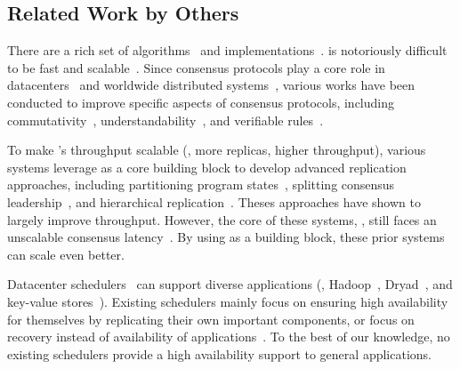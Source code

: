 \vspace{-.15in}\subsection{Related Work by Others} 
\label{sec:others-work}\vspace{-.075in}

There are a rich set of \paxos 
algorithms~\cite{paxos:practical,paxos,paxos:simple,paxos:complex,
epaxos:sosp13} 
and implementations~\cite{paxos:live,paxos:practical,chubby:osdi,crane:sosp15}. 
\paxos is notoriously difficult to be fast and 
scalable~\cite{ellis:thesis,manos:hotdep10,scatter:sosp11}. Since consensus 
protocols play a core role in datacenters~\cite{matei:hotcloud11, mesos:nsdi11, 
datacenter:os} and worldwide 
distributed systems~\cite{spanner:osdi12,mencius:osdi08}, various works 
have been conducted to improve specific aspects of consensus protocols, 
including commutativity~\cite{epaxos:sosp13}, 
understandability~\cite{raft:usenix14,paxos}, and verifiable 
rules~\cite{modist:nsdi09,demeter:sosp11}.

To make \paxos's throughput scalable (\ie, more replicas, higher throughput), 
various systems leverage \paxos as a core building block to develop advanced 
replication approaches, including partitioning program 
states~\cite{scatter:sosp11,ssmr:dsn14}, splitting consensus 
leadership~\cite{mencius:osdi08,spaxos:srds12}, and hierarchical 
replication~\cite{manos:hotdep10,scatter:sosp11}. Theses approaches have shown 
to largely improve throughput. However, the core of these systems, 
\paxos, still faces an unscalable consensus 
latency~\cite{ellis:thesis,scatter:sosp11,manos:hotdep10}. By using \xxx as a 
building block, these prior systems can scale even better.

 Datacenter
schedulers~\cite{borg:eurosys15,mesos:nsdi11,tupperware,yarn:socc13,
autopilot:sosp07,quincy:sosp09,apollo:osdi14,fuxi:vldb14} can support diverse 
applications (\eg, Hadoop~\cite{hadoop}, Dryad~\cite{dryad}, and key-value 
stores~\cite{redis}). Existing schedulers mainly focus on ensuring high 
availability for themselves by replicating their own important components, or 
focus on recovery instead of availability of applications~\cite{fuxi:vldb14}. 
To the best of our knowledge, no existing schedulers provide a
high availability support to general applications.


